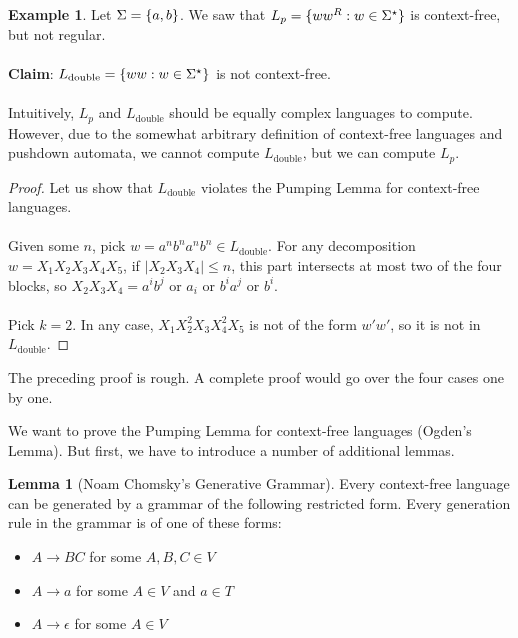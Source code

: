 \documentclass[]{article}
\DeclarePairedDelimiter{\set}{\lbrace}{\rbrace}
\theoremstyle{definition}
\newtheorem*{lemma}{Lemma}
\newtheorem{ex}{Example}[section]
\begin{document}
      \begin{ex}
        Let $\Sigma = \set{a, b}$. We saw that $L_p = \set{w w^R : w \in \Sigma^\star}$ is context-free, but not regular.
        \\ \\
        \textbf{Claim}: $L_\text{double} = \set{ ww : w  \in \Sigma^\star }$ is not context-free.
        \\ \\
        Intuitively, $L_p$ and $L_\text{double}$ should be equally complex languages to compute. However, due to the somewhat arbitrary definition of context-free languages and pushdown automata, we cannot compute $L_\text{double}$, but we can compute $L_p$.

        \begin{proof}
          Let us show that $L_\text{double}$ violates the Pumping Lemma for context-free languages.
          \\ \\
          Given some $n$, pick $w = a^n b^n a^n b^n \in L_\text{double}$. For any decomposition $w = X_1 X_2 X_3 X_4 X_5$, if $|X_2 X_3 X_4| \le n$, this part intersects at most two of the four blocks, so $X_2 X_3 X_4 = a^i b^j$ or $a_i$ or $b^i a^j$ or $b^i$.
          \\ \\
          Pick $k = 2$. In any case, $X_1 X_2^2 X_3 X_4^2 X_5$ is not of the form $w' w'$, so it is not in $L_\text{double}$.
        \end{proof}

        The preceding proof is rough. A complete proof would go over the four cases one by one.
      \end{ex}

      We want to prove the Pumping Lemma for context-free languages (Ogden's Lemma). But first, we have to introduce a number of additional lemmas.

      \begin{lemma}[Noam Chomsky's Generative Grammar]
        Every context-free language can be generated by a grammar of the following restricted form. Every generation rule in the grammar is of one of these forms:
        \begin{itemize}
          \item $A \to BC$ for some $A, B, C \in V$
          \item $A \to a$ for some $A \in V$ and $a \in T$
          \item $A \to \epsilon$ for some $A \in V$
        \end{itemize}
      \end{lemma}
\end{document}
